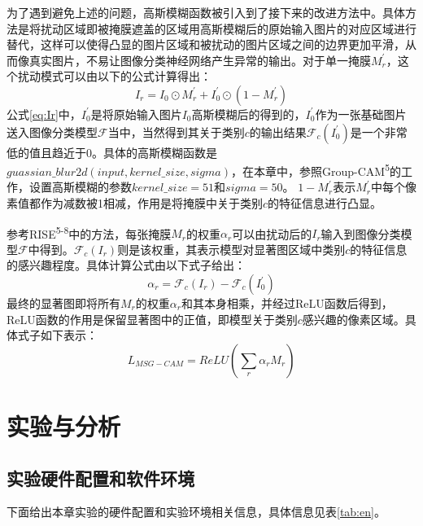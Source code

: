 为了遇到避免上述的问题，高斯模糊函数被引入到了接下来的改进方法中。具体方法是将扰动区域即被掩膜遮盖的区域用高斯模糊后的原始输入图片的对应区域进行替代，这样可以使得凸显的图片区域和被扰动的图片区域之间的边界更加平滑，从而像真实图片，不易让图像分类神经网络产生异常的输出。对于单一掩膜$M^{\prime}_r$，这个扰动模式可以由以下的公式计算得出：
\begin{equation}
	I_r=I_0\odot M^{\prime}_r+I^{\prime}_0\odot (1-M^{\prime}_r)
	\label{eq:Ir}
\end{equation}
公式\ref{eq:Ir}中，$I^{\prime}_0$是将原始输入图片$I_0$高斯模糊后的得到的，$I^{\prime}_0$作为一张基础图片送入图像分类模型$\mathcal{F}$当中，当然得到其关于类别$c$的输出结果$\mathcal{F}_c(I^{\prime}_0)$是一个非常低的值且趋近于0。具体的高斯模糊函数是$guassian\_blur2d(input,kernel\_size,sigma)$，在本章中，参照Group-CAM\textsuperscript{\cite{zhang2021novel}5}的工作，设置高斯模糊的参数$kernel\_size=51$和$sigma=50$。 $1-M^{\prime}_r$表示$M^{\prime}_r$中每个像素值都作为减数被1相减，作用是将掩膜中关于类别$c$的特征信息进行凸显。

参考RISE\textsuperscript{\cite{petsiuk2018rise}5-8}中的方法，每张掩膜$M_r$的权重$\alpha_r$可以由扰动后的$I_r$输入到图像分类模型$\mathcal{F}$中得到。$\mathcal{F}_c(I_r)$则是该权重，其表示模型对显著图区域中类别$c$的特征信息的感兴趣程度。具体计算公式由以下式子给出：
\begin{equation}
	\alpha_r=\mathcal{F}_c(I_r)-\mathcal{F}_c(I^{\prime}_0)
\end{equation}
最终的显著图即将所有$M_r$的权重$\alpha_r$和其本身相乘，并经过ReLU函数后得到，ReLU函数的作用是保留显著图中的正值，即模型关于类别$c$感兴趣的像素区域。具体式子如下表示：
\begin{equation}
	L_{MSG-CAM}=ReLU(\sum_{r}\alpha_r M_r)
\end{equation}
 

 
 
\section{实验与分析}

\subsection{实验硬件配置和软件环境}
下面给出本章实验的硬件配置和实验环境相关信息，具体信息见表\ref{tab:en}。

